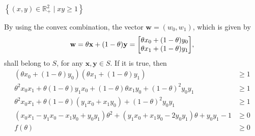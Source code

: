 \documentclass[12pt,a4paper]{article}
\begin{document}




\subproblem  \(\left\{ (x,y) \in \mathbb{R}_{+}^{2} \mid xy \geq 1 \right\}\)

By using the convex combination, the vector \(\mathbf{w} = (w_0, w_1)\), which is given by
\begin{align}
    \mathbf{w} = \theta \mathbf{x} + (1-\theta)\mathbf{y} = \mqty[\theta x_0 + (1 - \theta)y_0 \\ \theta x_1 + (1 - \theta)y_1],
\end{align}
shall belong to \(S\), for any \(\mathbf{x}, \mathbf{y} \in S\). If it is true, then
\begin{align}
    (\theta x_0 + (1 - \theta)y_0)(\theta x_1 + (1 - \theta)y_1) & \geq 1\\
    \theta^2 x_0 x_1 + \theta(1 - \theta)y_1 x_0 + (1 - \theta)\theta x_1 y_0 + (1 - \theta)^2 y_0 y_1 & \geq 1\\
    \theta^2 x_0 x_1 + \theta(1 - \theta)(y_1 x_0 + x_1 y_0) + (1 - \theta)^2 y_0 y_1 & \geq 1 \\
    (x_0 x_1 - y_1 x_0 - x_1 y_0 + y_0 y_1 )\theta^2 + (y_1 x_0 + x_1 y_0 - 2y_0 y_1) \theta + y_0 y_1 - 1 & \geq 0 \\
    f(\theta)& \geq 0
\end{align}
\end{document}
